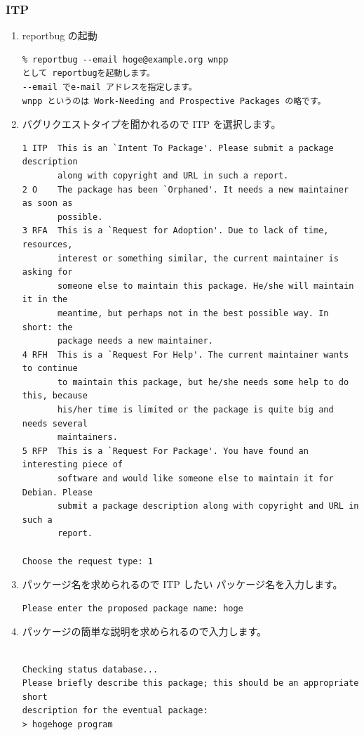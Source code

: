 \documentclass[mingoth]{jsarticle}
\begin{document}
    \subsubsection{ ITP }
		\begin{enumerate}
        \item reportbug の起動
		\begin{verbatim}
% reportbug --email hoge@example.org wnpp
として reportbugを起動します。
--email でe-mail アドレスを指定します。
wnpp というのは Work-Needing and Prospective Packages の略です。
		\end{verbatim}
        \item バグリクエストタイプを聞かれるので ITP を選択します。
		\begin{verbatim}
1 ITP  This is an `Intent To Package'. Please submit a package description
       along with copyright and URL in such a report.
2 O    The package has been `Orphaned'. It needs a new maintainer as soon as
       possible.
3 RFA  This is a `Request for Adoption'. Due to lack of time, resources,
       interest or something similar, the current maintainer is asking for
       someone else to maintain this package. He/she will maintain it in the
       meantime, but perhaps not in the best possible way. In short: the
       package needs a new maintainer.
4 RFH  This is a `Request For Help'. The current maintainer wants to continue
       to maintain this package, but he/she needs some help to do this, because
       his/her time is limited or the package is quite big and needs several
       maintainers.
5 RFP  This is a `Request For Package'. You have found an interesting piece of
       software and would like someone else to maintain it for Debian. Please
       submit a package description along with copyright and URL in such a
       report.

Choose the request type: 1
\end{verbatim}

        \item パッケージ名を求められるので ITP したい パッケージ名を入力します。
		\begin{verbatim}
Please enter the proposed package name: hoge
		\end{verbatim}

        \item パッケージの簡単な説明を求められるので入力します。
		\begin{verbatim}

Checking status database...
Please briefly describe this package; this should be an appropriate short
description for the eventual package:
> hogehoge program
		\end{verbatim}


\end{enumerate}
\end{document}
